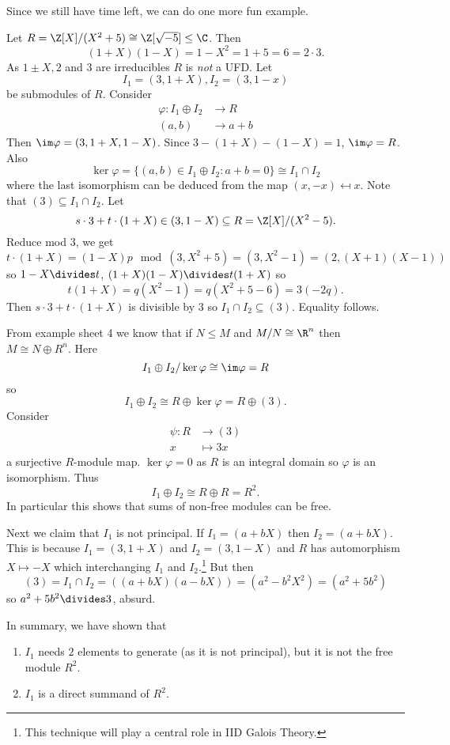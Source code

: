 \documentclass[a4paper]{article}
\theoremstyle{definition}
\begin{document}
Since we still have time left, we can do one more fun example.

\begin{eg}
  Let \(R = \Z[X]/(X^2 + 5) \cong \Z[\sqrt{-5}] \leq \C\). Then
  \[
    (1 + X)(1 - X) = 1 - X^2 = 1 + 5 = 6 = 2 \cdot 3.
  \]
  As \(1 \pm X, 2\) and \(3\) are irreducibles \(R\) is \emph{not} a UFD. Let
  \[
    I_1 = (3, 1 + X), I_2 = (3, 1 - x)
  \]
  be submodules of \(R\). Consider
  \begin{align*}
    \varphi: I_1 \oplus I_2 &\to R \\
    (a, b) &\to a + b
  \end{align*}
  Then \(\im \varphi = (3, 1 + X, 1 - X)\). Since \(3 - (1 + X) - (1 - X) = 1\), \(\im \varphi = R\). Also
  \[
    \ker \varphi = \{(a, b) \in I_1 \oplus I_2 : a + b = 0\} \cong I_1 \cap I_2
  \]
  where the last isomorphism can be deduced from the map \((x, -x) \mapsfrom x\). Note that \((3) \subseteq I_1 \cap I_2\). Let
  \[
    s \cdot 3 + t \cdot (1 + X) \in (3, 1 - X) \subseteq R = \Z[X]/(X^2 - 5).
  \]
  Reduce mod \(3\), we get
  \[
    t \cdot (1 + X) = (1 - X)p \mod (3, X^2 + 5) = (3, X^2 - 1) = (2, (X + 1)(X - 1))
  \]
  so \(1 - X \divides t\), \((1 + X)(1 - X) \divides t(1 + X)\) so
  \[
    t(1 + X) = q(X^2 - 1) = q(X^2 + 5 -6) = 3(-2q).
  \]
  Then \(s \cdot 3 + t \cdot (1 + X)\) is divisible by \(3\) so \(I_1 \cap I_2 \subseteq (3)\). Equality follows.

  From example sheet 4 we know that if \(N \leq M\) and \(M/N \cong \R^n\) then \(M \cong N \oplus R^n\). Here
  \[
    I_1 \oplus I_2/\ker \varphi \cong \im \varphi = R
  \]
  so
  \[
    I_1 \oplus I_2 \cong R \oplus \ker \varphi = R \oplus (3).
  \]
  Consider
  \begin{align*}
    \psi: R &\to (3) \\
    x &\mapsto 3x
  \end{align*}
  a surjective \(R\)-module map. \(\ker \varphi = 0\) as \(R\) is an integral domain so \(\varphi\) is an isomorphism. Thus
  \[
    I_1 \oplus I_2 \cong R \oplus R = R^2.
  \]
  In particular this shows that sums of non-free modules can be free.

  Next we claim that \(I_1\) is not principal. If \(I_1 = (a + bX)\) then \(I_2 = (a + bX)\). This is because \(I_1 = (3, 1 + X)\) and \(I_2 = (3, 1 - X)\) and \(R\) has automorphism \(X \mapsto -X\) which interchanging \(I_1\) and \(I_2\).\footnote{This technique will play a central role in IID Galois Theory.} But then
  \[
    (3) = I_1 \cap I_2 = ((a + bX)(a - bX)) = (a^2 - b^2X^2) = (a^2 + 5b^2)
  \]
  so \(a^2 + 5b^2 \divides 3\), absurd.

  In summary, we have shown that
  \begin{enumerate}
  \item \(I_1\) needs \(2\) elements to generate (as it is not principal), but it is not the free module \(R^2\).
  \item \(I_1\) is a direct summand of \(R^2\).
  \end{enumerate}
\end{eg}

\printindex
\end{document}
